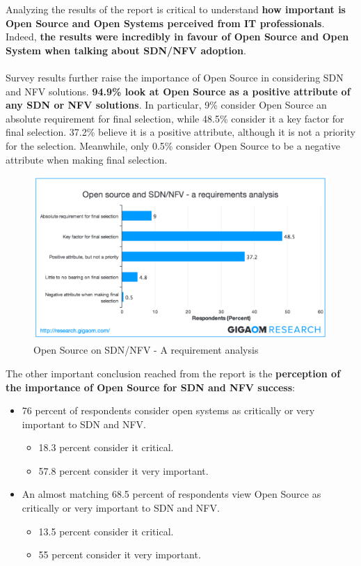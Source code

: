 \documentclass[a4paper, 12pt]{book}
\begin{document}
Analyzing the results of the report is critical to understand \textbf{how important is Open Source and Open Systems perceived from IT professionals}. Indeed, \textbf{the results were incredibly in favour of Open Source and Open System when talking about SDN/NFV adoption}.\\
\\
Survey results further raise the importance of Open Source in considering SDN and NFV solutions. \textbf{94.9\% look at Open Source as a positive attribute of any SDN or NFV solutions}. In particular, 9\% consider Open Source an absolute requirement for final selection, while 48.5\% consider it a key factor for final selection. 37.2\% believe it is a positive attribute, although it is not a priority for the selection. Meanwhile, only 0.5\% consider Open Source to be a negative attribute when making final selection.
\begin{center}
 \begin{figure}[H]
 \begin{center}
   \includegraphics[width=15cm]{img/open-source-requirement-operator-view-00.png}
   \caption{Open Source on SDN/NFV - A requirement analysis}
   \label{fig:sdn_hype_cyle}
 \end{center}
 \end{figure}
\end{center}
The other important conclusion reached from the report is the \textbf{perception of the importance of Open Source for SDN and NFV success}:
\begin{itemize}\itemsep0pt
\item{76 percent of respondents consider open systems as critically or very important to SDN and NFV}.
\begin{itemize}\itemsep0pt
\item{18.3 percent consider it critical.}
\item{57.8 percent consider it very important.}
\end{itemize}
\item{An almost matching 68.5 percent of respondents view Open Source as critically or very important to SDN and NFV}.
\begin{itemize}\itemsep0pt
\item{13.5 percent consider it critical.}
\item{55 percent consider it very important.}
\end{itemize}
\end{itemize}
\end{document}
